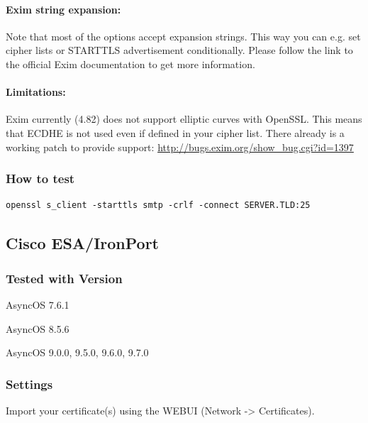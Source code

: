 \paragraph{Exim string expansion:}
Note that most of the options accept expansion strings. This way you can e.g. set cipher lists or STARTTLS advertisement conditionally. Please follow the link to the official Exim documentation to get more information.

\paragraph{Limitations:}
Exim currently (4.82) does not support elliptic curves with OpenSSL. This means that ECDHE is not used even if defined in your cipher list.
There already is a working patch to provide support:
\url{http://bugs.exim.org/show_bug.cgi?id=1397}

\subsubsection{How to test}
\begin{lstlisting}
openssl s_client -starttls smtp -crlf -connect SERVER.TLD:25
\end{lstlisting}




\subsection{Cisco ESA/IronPort}
\subsubsection{Tested with Version}
\begin{itemize*}
  \item AsyncOS 7.6.1
  \item AsyncOS 8.5.6
  \item AsyncOS 9.0.0, 9.5.0, 9.6.0, 9.7.0
\end{itemize*}

\subsubsection{Settings}
Import your certificate(s) using the WEBUI (Network -> Certificates).

